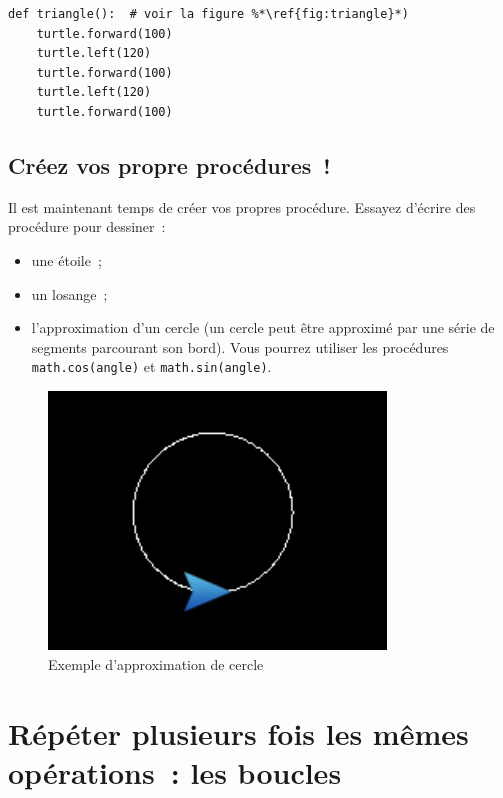 \documentclass[11pt,a4paper]{article}
\begin{document}
\begin{lstlisting}[float]
def triangle():  # voir la figure %*\ref{fig:triangle}*)
    turtle.forward(100)
    turtle.left(120)
    turtle.forward(100)
    turtle.left(120)
    turtle.forward(100)
\end{lstlisting}

\subsection{Créez vos propre procédures~!}

Il est maintenant temps de créer vos propres procédure. Essayez d'écrire des
procédure pour dessiner~:

\begin{itemize}
    \item une étoile~;
    \item un losange~;
    \item l'approximation d'un cercle (un cercle peut être approximé par une
        série de segments parcourant son bord). Vous pourrez utiliser les
        procédures \lstinline{math.cos(angle)} et \lstinline{math.sin(angle)}.
\end{itemize}

\begin{figure}
    \centering
    \includegraphics[width=0.8\textwidth]{img/approx_circle}
    \caption{Exemple d'approximation de cercle}
    \label{fig:circle}
\end{figure}

\section{Répéter plusieurs fois les mêmes opérations~: les boucles}
\end{document}
